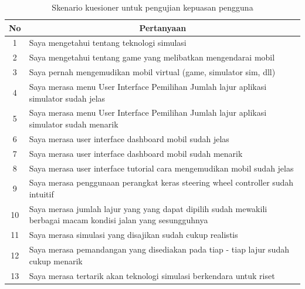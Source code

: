 \begin{table}[]
\caption{Skenario kuesioner untuk pengujian kepuasan pengguna}
\label{tb:4_7}
\begin{tabular}{|c|p{9.5cm}|}
\hline
\textbf{No} & \multicolumn{1}{c|}{\textbf{Pertanyaan}}                                                                         \\ \hline
1           & Saya mengetahui tentang teknologi simulasi                                                                       \\ \hline
2           & Saya mengetahui tentang game yang melibatkan mengendarai mobil                                                   \\ \hline
3           & Saya pernah mengemudikan mobil virtual (game, simulator sim, dll)                                                \\ \hline
4           & Saya merasa menu User Interface Pemilihan Jumlah lajur aplikasi simulator   sudah jelas                          \\ \hline
5           & Saya merasa menu User Interface Pemilihan Jumlah lajur aplikasi simulator   sudah menarik                        \\ \hline
6           & Saya merasa user interface dashboard mobil sudah jelas                                                           \\ \hline
7           & Saya merasa user interface dashboard mobil sudah menarik                                                         \\ \hline
8           & Saya merasa user interface tutorial cara mengemudikan mobil sudah jelas                                          \\ \hline
9           & Saya merasa penggunaan perangkat keras steering wheel controller sudah   intuitif                                \\ \hline
10          & Saya merasa jumlah lajur yang yang dapat dipilih sudah mewakili berbagai   macam kondisi jalan yang sesungguhnya \\ \hline
11          & Saya merasa simulasi yang disajikan sudah cukup realistis                                                        \\ \hline
12          & Saya merasa pemandangan yang disediakan pada tiap - tiap lajur sudah   cukup menarik                             \\ \hline
13          & Saya merasa tertarik akan teknologi simulasi berkendara untuk riset                                              \\ \hline

\end{tabular}
\end{table}
